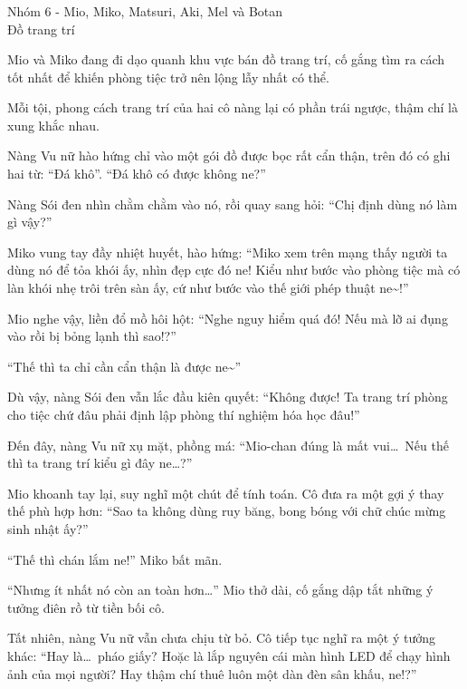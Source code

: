 \documentclass[../main.tex]{subfiles}
\begin{document}
\vspace{-40pt}
\subsubsection*{\label{P1.1f}}

\begin{center}
    {\color{T6} Nhóm 6 - Mio, Miko, Matsuri, Aki, Mel và Botan\\Đồ trang trí}
\end{center}

Mio và Miko đang đi dạo quanh khu vực bán đồ trang trí, cố gắng tìm ra cách tốt nhất để khiến phòng tiệc trở nên lộng lẫy nhất có thể.

Mỗi tội, phong cách trang trí của hai cô nàng lại có phần trái ngược, thậm chí là xung khắc nhau.

Nàng Vu nữ hào hứng chỉ vào một gói đồ được bọc rất cẩn thận, trên đó có ghi hai từ: ``Đá khô''. ``Đá khô có được không ne?''

Nàng Sói đen nhìn chằm chằm vào nó, rồi quay sang hỏi: ``Chị định dùng nó làm gì vậy?''

Miko vung tay đầy nhiệt huyết, hào hứng: ``Miko xem trên mạng thấy người ta dùng nó để tỏa khói ấy, nhìn đẹp cực đó ne! Kiểu như bước vào phòng tiệc mà có làn khói nhẹ trôi trên sàn ấy, cứ như bước vào thế giới phép thuật ne\~{}!''

Mio nghe vậy, liền đổ mồ hôi hột: ``Nghe nguy hiểm quá đó! Nếu mà lỡ ai đụng vào rồi bị bỏng lạnh thì sao!?''

``Thế thì ta chỉ cần cẩn thận là được ne\~{}''

Dù vậy, nàng Sói đen vẫn lắc đầu kiên quyết: ``Không được! Ta trang trí phòng cho tiệc chứ đâu phải định lập phòng thí nghiệm hóa học đâu!''

Đến đây, nàng Vu nữ xụ mặt, phồng má: ``Mio-chan đúng là mất vui\dots\ Nếu thế thì ta trang trí kiểu gì đây ne\dots?''

Mio khoanh tay lại, suy nghĩ một chút để tính toán. Cô đưa ra một gợi ý thay thế phù hợp hơn: ``Sao ta không dùng ruy băng, bong bóng với chữ chúc mừng sinh nhật ấy?''

``Thế thì chán lắm ne!'' Miko bất mãn.

``Nhưng ít nhất nó còn an toàn hơn\dots'' Mio thở dài, cố gắng dập tắt những ý tưởng điên rồ từ tiền bối cô.

Tất nhiên, nàng Vu nữ vẫn chưa chịu từ bỏ. Cô tiếp tục nghĩ ra một ý tưởng khác: ``Hay là\dots\ pháo giấy? Hoặc là lắp nguyên cái màn hình LED để chạy hình ảnh của mọi người? Hay thậm chí thuê luôn một dàn đèn sân khấu, ne!?''
\end{document}

